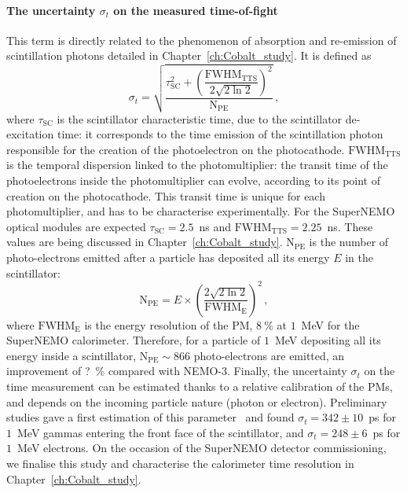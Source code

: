 \paragraph{The uncertainty $\sigma_{t}$ on the measured time-of-fight}
This term is directly related to the phenomenon of absorption and re-emission of scintillation photons detailed in Chapter~\ref{ch:Cobalt_study}.
It is defined as
\begin{equation}
  \sigma_{t}=\sqrt{\dfrac{\tau_{\text{SC}}^{2}+\left(\dfrac{\text{FWHM}_{\text{TTS}}}{2\sqrt{2\ln{2}}}\right)^{2}}{\text{N}_\text{PE}}}\,,
  \label{eq:sigma_t}
\end{equation}
where $\tau_{\text{SC}}$ is the scintillator characteristic time, due to the scintillator de-excitation time: it corresponds to the time emission of the scintillation photon responsible for the creation of the photoelectron on the photocathode.
$\text{FWHM}_{\text{TTS}}$ is the temporal dispersion linked to the photomultiplier: the transit time of the photoelectrons inside the photomultiplier can evolve, according to its point of creation on the photocathode.
This transit time is unique for each photomultiplier, and has to be characterise experimentally.
For the SuperNEMO optical modules are expected $\tau_{\text{SC}}=2.5$~ns and $\text{FWHM}_{\text{TTS}}=2.25$~ns.
These values are being discussed in Chapter~\ref{ch:Cobalt_study}.
$\text{N}_\text{PE}$ is the number of photo-electrons emitted after a particle has deposited all its energy $E$ in the scintillator:
\begin{equation}
  \text{N}_\text{PE} = E\times \left(\frac{2\sqrt{2\ln 2}}{\text{FWHM}_{\text{E}}}\right)^{2}\,,
\end{equation}
where $\text{FWHM}_{\text{E}}$ is the energy resolution of the PM, $8~\%$ at $1$~MeV for the SuperNEMO calorimeter.
Therefore, for a particle of $1$~MeV depositing all its energy inside a scintillator, $\text{N}_\text{PE}\sim 866$ photo-electrons are emitted, an improvement of ?~\% compared with NEMO-$3$.
Finally, the uncertainty $\sigma_{t}$ on the time measurement can be estimated thanks to a relative calibration of the PMs, and depends on the incoming particle nature (photon or electron).
Preliminary studies gave a first estimation of this parameter~\cite{HuberThesis} and found $\sigma_{t}=342\pm 10$~ps for $1$~MeV gammas entering the front face of the scintillator, and $\sigma_{t}=248\pm 6$~ps for $1$~MeV electrons.
On the occasion of the SuperNEMO detector commissioning, we finalise this study and characterise the calorimeter time resolution in Chapter~\ref{ch:Cobalt_study}.

